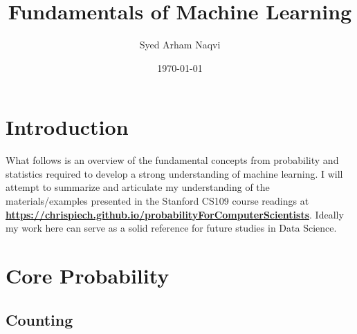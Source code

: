 \documentclass[11pt]{article}
\title{Fundamentals of Machine Learning}
\author{Syed Arham Naqvi}
\date{\today}
\newcommand{\BF}{\textbf}
\begin{document}
\maketitle
\tableofcontents
\newpage

\section{Introduction}
What follows is an overview of the fundamental concepts from probability and statistics required to develop a strong understanding
of machine learning. I will attempt to summarize and articulate my understanding of the materials/examples presented in the Stanford CS109
course readings at \BF{\underline{https://chrispiech.github.io/probabilityForComputerScientists}}. Ideally my work here can serve as a
solid reference for future studies in Data Science.
\newpage

\section{Core Probability}
\subsection{Counting}
\end{document}
